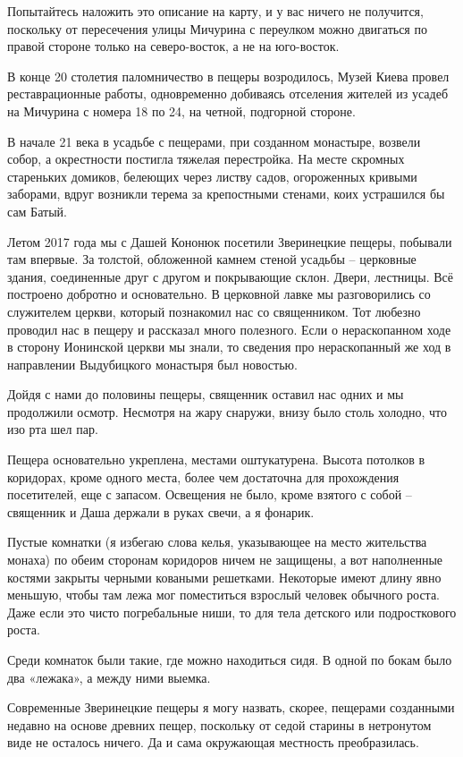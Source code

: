 Попытайтесь наложить это описание на карту, и у вас ничего не получится, поскольку от пересечения улицы Мичурина с переулком можно двигаться по правой стороне только на северо-восток, а не на юго-восток.

В конце 20 столетия паломничество в пещеры возродилось, Музей Киева провел реставрационные работы, одновременно добиваясь отселения жителей из усадеб на Мичурина с номера 18 по 24, на четной, подгорной стороне.

В начале 21 века в усадьбе с пещерами, при созданном монастыре, возвели собор, а окрестности постигла тяжелая перестройка. На месте скромных стареньких домиков, белеющих через листву садов, огороженных кривыми заборами, вдруг возникли терема за крепостными стенами, коих устрашился бы сам Батый.

Летом 2017 года мы с Дашей Кононюк посетили Зверинецкие пещеры, побывали там впервые. За толстой, обложенной камнем стеной усадьбы – церковные здания, соединенные друг с другом и покрывающие склон. Двери, лестницы. Всё построено добротно и основательно. В церковной лавке мы разговорились со служителем церкви, который познакомил нас со священником. Тот любезно проводил нас в пещеру и рассказал много полезного. Если о нераскопанном ходе в сторону Ионинской церкви мы знали, то сведения про нераскопанный же ход в направлении Выдубицкого монастыря был новостью.

Дойдя с нами до половины пещеры, священник оставил нас одних и мы продолжили осмотр. Несмотря на жару снаружи, внизу было столь холодно, что изо рта шел пар.

Пещера основательно укреплена, местами оштукатурена. Высота потолков в коридорах, кроме одного места, более чем достаточна для прохождения посетителей, еще с запасом. Освещения не было, кроме взятого с собой – священник и Даша держали в руках свечи, а я фонарик.

Пустые комнатки (я избегаю слова келья, указывающее на место жительства монаха) по обеим сторонам коридоров ничем не защищены, а вот наполненные костями закрыты черными коваными решетками. Некоторые имеют длину явно меньшую, чтобы там лежа мог поместиться взрослый человек обычного роста. Даже если это чисто погребальные ниши, то для тела детского или подросткового роста.

Среди комнаток были такие, где можно находиться сидя. В одной по бокам было два «лежака», а между ними выемка.

Современные Зверинецкие пещеры я могу назвать, скорее, пещерами созданными недавно на основе древних пещер, поскольку от седой старины в нетронутом виде не осталось ничего. Да и сама окружающая местность преобразилась.

